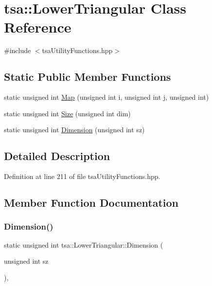 \hypertarget{classtsa_1_1_lower_triangular}{}\section{tsa\+:\+:Lower\+Triangular Class Reference}
\label{classtsa_1_1_lower_triangular}


{\ttfamily \#include $<$tsa\+Utility\+Functions.\+hpp$>$}

\subsection*{Static Public Member Functions}
\begin{DoxyCompactItemize}
\item 
static unsigned int \hyperlink{classtsa_1_1_lower_triangular_a968298d0e21e8eff3959fe9eb69eee8a}{Map} (unsigned int i, unsigned int j, unsigned int)
\item 
static unsigned int \hyperlink{classtsa_1_1_lower_triangular_a553ac56eb5320ef223c61951290429d0}{Size} (unsigned int dim)
\item 
static unsigned int \hyperlink{classtsa_1_1_lower_triangular_ae0be1ed16dc6f469852699898aa16df3}{Dimension} (unsigned int sz)
\end{DoxyCompactItemize}


\subsection{Detailed Description}


Definition at line 211 of file tsa\+Utility\+Functions.\+hpp.



\subsection{Member Function Documentation}
\mbox{\label{classtsa_1_1_lower_triangular_ae0be1ed16dc6f469852699898aa16df3}} 
\subsubsection{\texorpdfstring{Dimension()}{Dimension()}}
{\footnotesize\ttfamily static unsigned int tsa\+::\+Lower\+Triangular\+::\+Dimension (\begin{DoxyParamCaption}\item[{unsigned int}]{sz }\end{DoxyParamCaption})\hspace{0.3cm}{\ttfamily [inline]}, {\ttfamily [static]}}



